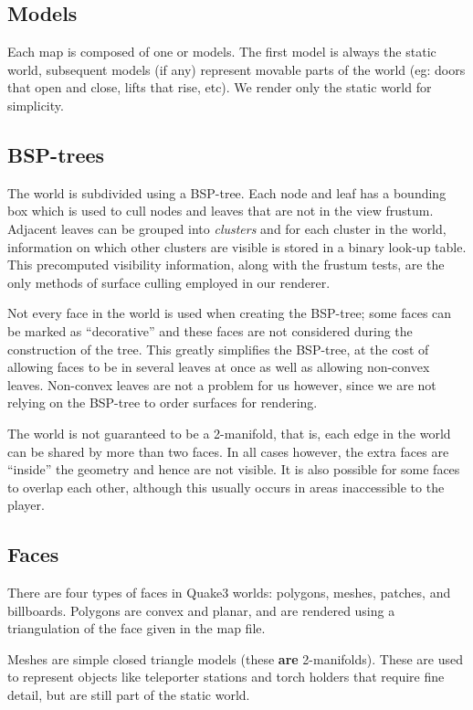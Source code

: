 \documentclass{llncs}
\begin{document}
\begin{multicols}{2}
{\subsection{Models} Each map is composed of one or models.  The first model is always
the static world, subsequent models (if any) represent movable parts of the world
(eg: doors that open and close, lifts that rise, etc).  We render only the static world 
for simplicity. 

\subsection{BSP-trees} The world is subdivided using a BSP-tree.  Each node
and leaf has a bounding box which is used to cull nodes and leaves that are not
in the view frustum.  Adjacent leaves can be grouped into \textit{clusters} and
for each cluster in the world, information on which other clusters are visible is stored 
in a binary look-up table.  This precomputed visibility information, 
along with the frustum tests, are the only methods of surface culling employed in our renderer.

Not every face in the world is used when creating the BSP-tree;  some faces can be 
marked as ``decorative'' and these faces are not considered during the construction
of the tree.  This greatly simplifies the BSP-tree, at the cost of allowing faces to be in 
several leaves at once as well as allowing non-convex leaves.  Non-convex leaves are not a 
problem for us however, since we are not relying on the BSP-tree to order surfaces for 
rendering. 

The world is not guaranteed to be a 2-manifold, that is, each edge in the world can be
shared by more than two faces.  In all cases however, the extra faces are ``inside'' the
geometry and hence are not visible.  It is also possible for some faces to overlap 
each other, although this usually occurs in areas inaccessible to the player.

\subsection{Faces} There are four types of faces in Quake3 worlds: 
polygons, meshes, patches, and billboards.  Polygons are convex and planar, and
are rendered using a triangulation of the face given in the map file.

Meshes are simple closed triangle models (these \textbf{are} 2-manifolds). 
These are used to represent objects like teleporter stations and torch holders that
require fine detail, but are still part of the static world. 

}
\end{multicols}
\end{document}
